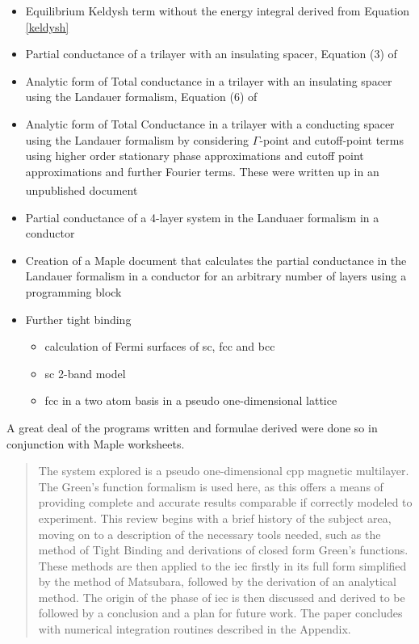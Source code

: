 \documentclass[a4paper, 12pt]{article}
\newcommand{\site}[1]{\textsuperscript{\textcolor{blue}{\cite{#1}}}}
\begin{document}
\begin{itemize}
	\item{Equilibrium Keldysh term without the energy integral derived from Equation \eqref{keldysh}}
	\item{Partial conductance of a trilayer with an insulating spacer, Equation (3) of \textcolor{blue}{\cite{Mathon2016}}}
	\item{Analytic form of Total conductance in a trilayer with an insulating spacer using the Landauer formalism, Equation (6) of \textcolor{blue}{\cite{Mathon2016}}}
	\item{Analytic form of Total Conductance in a trilayer with a conducting spacer using the Landauer formalism by considering $\Gamma$-point and cutoff-point terms using higher order stationary phase approximations and cutoff point approximations and further Fourier terms. These were written up in an unpublished document\site{me}}
	\item{Partial conductance of a 4-layer system in the Landuaer formalism in a conductor}
	\item{Creation of a Maple document that calculates the partial conductance in the Landauer formalism in a conductor for an arbitrary number of layers using a programming block}
	\item{Further tight binding}
		\begin{itemize}
			\item{calculation of Fermi surfaces of \gls{sc}, \gls{fcc} and \gls{bcc}}
			\item{\gls{sc} 2-band model}
			\item{\gls{fcc} in a two atom basis in a pseudo one-dimensional lattice}
		\end{itemize}
\end{itemize}
A great deal of the programs written and formulae derived were done so in conjunction with Maple worksheets.
	\newpage
	\begin{abstract}
		The system explored is a pseudo one-dimensional \gls{cpp} magnetic multilayer. The Green's function formalism is used here, as this offers a means of providing complete and accurate results comparable if correctly modeled to experiment. This review begins with a brief history of the subject area, moving on to a description of the necessary tools needed, such as the method of Tight Binding and derivations of closed form Green's functions. These methods are then applied to the \gls{iec} firstly in its full form simplified by the method of Matsubara, followed by the derivation of an analytical method. The origin of the phase of \gls{iec} is then discussed and derived to be followed by a conclusion and a plan for future work. The paper concludes with numerical integration routines described in the Appendix.
	\end{abstract}
\end{document}
